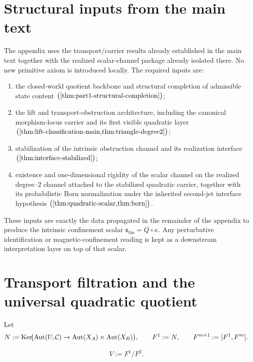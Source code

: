 \section{Structural inputs from the main text}
\label{sec:fusion-structural-inputs}
The appendix uses the transport/carrier results already
established in the main text together with the realized scalar-channel
package already isolated there.
No new primitive axiom is introduced locally.
The required inputs are:
\begin{enumerate}[label=\textup{(\roman*)}]
	\item
	      the closed-world quotient backbone and structural completion of
	      admissible state content
	      \(\bigl(\cref{thm:part1-structural-completion}\bigr)\);
	\item
	      the lift and transport-obstruction architecture, including the
	      canonical morphism-locus carrier and its first visible quadratic
	      layer
	      \(\bigl(\cref{thm:lift-classification-main,thm:triangle-degree2}\bigr)\);
	\item
	      stabilization of the intrinsic obstruction channel and its
	      realization interface
	      \(\bigl(\cref{thm:interface-stabilized}\bigr)\);
	\item
	      existence and one-dimensional rigidity of the scalar channel on the
	      realized degree--\(2\) channel attached to the stabilized
	      quadratic carrier, together with its probabilistic Born
	      normalization under the inherited second-jet interface
	      hypothesis
	      \(\bigl(\cref{thm:quadratic-scalar,thm:born}\bigr)\).
\end{enumerate}
These inputs are exactly the data propagated in the remainder of the
appendix to produce the intrinsic confinement scalar
\(\mathfrak s_{\mathrm{fus}}=Q\circ\kappa\).
Any perturbative identification or magnetic-confinement reading is kept
as a downstream interpretation layer on top of that scalar.
\section{Transport filtration and the universal quadratic quotient}
\label{sec:fusion-universal}
Let
\[
	N:=\operatorname{Ker}\!\bigl(\operatorname{Aut}(U,\mathcal C)\to \operatorname{Aut}(X_A)\times\operatorname{Aut}(X_B)\bigr),
	\qquad
	F^1:=N,
	\qquad
	F^{m+1}:=[F^1,F^m].
\]
\begin{definition}
	\[
		V:=F^1/F^2.
	\]
\end{definition}
